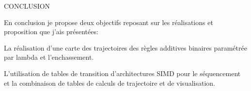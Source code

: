 \documentclass[a4paper]{slides}
\newcommand{\mytitle}[1]{\begin{center}\begin{large}#1\end{large}\end{center}}
\begin{document}
\begin{slide}
  \mytitle{CONCLUSION}
  En conclusion je propose deux objectifs reposant sur les r\'ealisations
  et proposition que j'ais pr\'esent\'ees:
  
  La r\'ealisation d'une carte des trajectoires des r\`egles
  additives binaires param\'etr\'ee par lambda et l'enchassement.
  
  L'utilisation de tables de transition d'architectures SIMD pour le
  s\'equencement et la combinaison de tables de calculs de trajectoire et
  de visualisation.
\end{slide}
\end{document}
